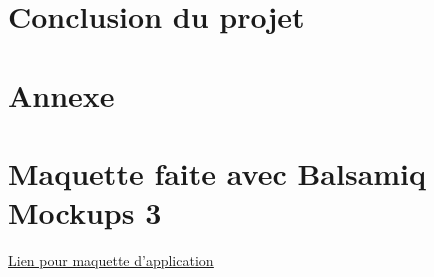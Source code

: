 \documentclass[12pt]{article}
\begin{document}
\section{Conclusion du projet}
\paragraph{}

\newpage




\newpage
\section{Annexe}
\newpage
\section{Maquette faite avec Balsamiq Mockups 3}
\label{Annexe-Maquette}
\href{https://drive.google.com/file/d/13S1_j926OpUDYI9evYTFl-aJDEXmhMbn/view?usp=sharing}{\underline{Lien pour maquette d'application}}
\end{document}
